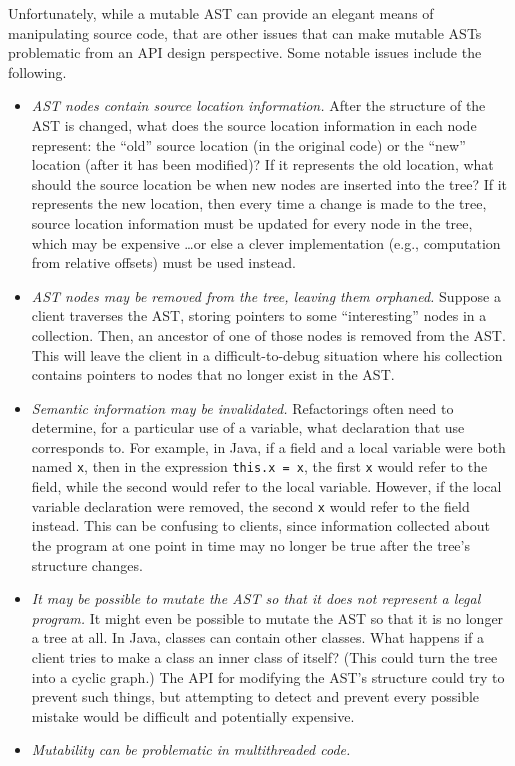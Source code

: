 \documentclass[prodmode]{acmlarge}
\newcommand{\ttt}[1]{\texttt{#1}}
\begin{document}
Unfortunately, while a mutable AST can provide an elegant means of manipulating
source code, that are other issues that can make mutable ASTs problematic from
an API design perspective.  Some notable issues include the following.
\begin{itemize}
\item \textit{AST nodes contain source location information.}  After the
structure of the AST is changed, what does the source location information in
each node represent: the ``old'' source location (in the original code) or the
``new'' location (after it has been modified)?  If it represents the old
location, what should the source location be when new nodes are inserted into
the tree?  If it represents the new location, then every time a change is made
to the tree, source location information must be updated for every node in the
tree, which may be expensive \dots or else a clever implementation (e.g.,
computation from relative offsets) must be used instead.
\item \textit{AST nodes may be removed from the tree, leaving them orphaned.}
Suppose a client traverses the AST, storing pointers to some ``interesting''
nodes in a collection.  Then, an ancestor of one of those nodes is removed from
the AST.  This will leave the client in a difficult-to-debug situation where
his collection contains pointers to nodes that no longer exist in the AST.
\item \textit{Semantic information may be invalidated.}  Refactorings often
need to determine, for a particular use of a variable, what declaration that
use corresponds to.  For example, in Java, if a field and a local variable were
both named \ttt{x}, then in the expression \ttt{this.x = x}, the first \ttt{x}
would refer to the field, while the second would refer to the local variable.
However, if the local variable declaration were removed, the second \ttt{x}
would refer to the field instead.  This can be confusing to clients, since
information collected about the program at one point in time may no longer be
true after the tree's structure changes.
\item \textit{It may be possible to mutate the AST so that it does not
represent a legal program.}  It might even be possible to mutate the AST so
that it is no longer a tree at all.  In Java, classes can contain other
classes.  What happens if a client tries to make a class an inner class of
itself?  (This could turn the tree into a cyclic graph.)  The API for modifying
the AST's structure could try to prevent such things, but attempting to detect
and prevent every possible mistake would be difficult and potentially
expensive.
\item \textit{Mutability can be problematic in multithreaded code.}
\end{itemize}
\end{document}
